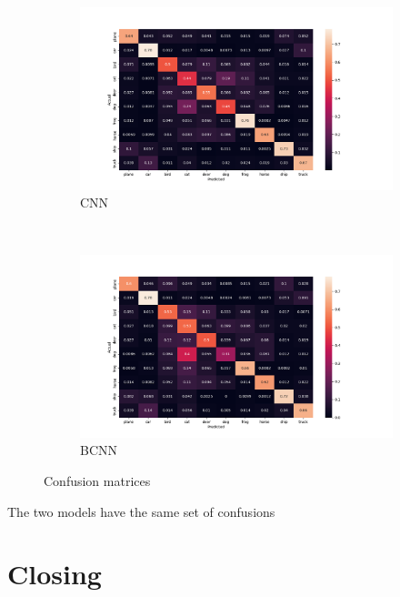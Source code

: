 \documentclass[12pt]{article}
\begin{document}
\begin{figure}[H]
	\centering
	\begin{subfigure}{\textwidth}
		\centering
		\includegraphics[width=.9\linewidth]{../Images/CNN_confusion_matrix}
		\caption{CNN}
	\end{subfigure} \\%
	\begin{subfigure}{\textwidth}
		\centering
		\includegraphics[width=.9\linewidth]{../Images/BNN_confusion_matrix}
		\caption{BCNN}
	\end{subfigure}
	\caption{Confusion matrices}
\end{figure}

The two models have the same set of confusions

\section{Closing}



\newpage

\printbibliography
\end{document}
